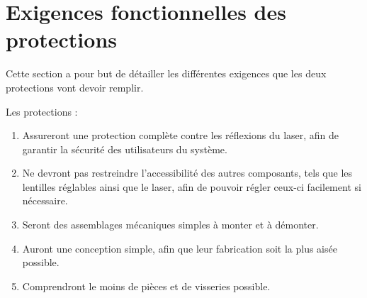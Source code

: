 \section{Exigences fonctionnelles des protections}
Cette section a pour but de détailler les différentes exigences que les deux protections vont devoir remplir.

Les protections :
\begin{enumerate}
    \item Assureront une protection complète contre les réflexions du laser, afin de garantir la sécurité des utilisateurs du système.
    \item Ne devront pas restreindre l'accessibilité des autres composants, tels que les lentilles réglables ainsi que le laser, afin de pouvoir régler ceux-ci facilement si nécessaire.
    \item Seront des assemblages mécaniques simples à monter et à démonter.
    \item Auront une conception simple, afin que leur fabrication soit la plus aisée possible.
    \item Comprendront le moins de pièces et de visseries possible.
\end{enumerate}
\clearpage

